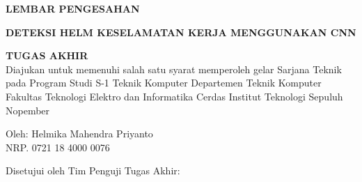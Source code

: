 \begin{center}
	\large
  \textbf{LEMBAR PENGESAHAN}
\end{center}

\thispagestyle{empty}

\begin{center}
  \textbf{DETEKSI HELM KESELAMATAN KERJA MENGGUNAKAN CNN}
\end{center}

\begingroup
  \small
  

  \begin{center}
    \textbf{TUGAS AKHIR}
    \\Diajukan untuk memenuhi salah satu syarat memperoleh gelar Sarjana Teknik pada Program Studi S-1 Teknik Komputer Departemen Teknik Komputer Fakultas Teknologi Elektro dan Informatika Cerdas Institut Teknologi Sepuluh Nopember
  \end{center}


  \begin{center}
    Oleh: Helmika Mahendra Priyanto
    \\NRP. 0721 18 4000 0076
  \end{center}



  \begin{center}
    Disetujui oleh Tim Penguji Tugas Akhir:
  \end{center}


  \begingroup
    \setlength{\tabcolsep}{0pt}

